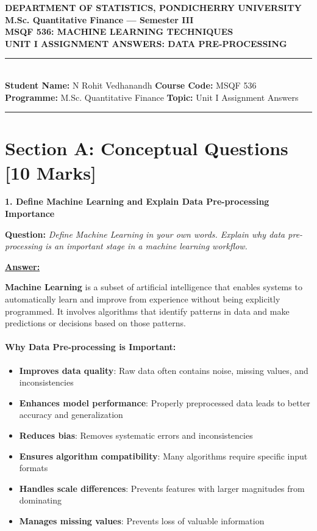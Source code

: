 \documentclass[11pt,a4paper]{article}
\newcommand{\questiontitle}[2]{%
    \vspace{0.4cm}%
    \noindent\textbf{\large\color{headerblue}#1. #2}\par\vspace{0.15cm}%
}
\newcommand{\qprompt}[1]{%
    \noindent\textbf{Question:} \textit{#1}\par\vspace{0.2cm}%
}
\newcommand{\answer}{\noindent\textbf{\underline{Answer:}}\par\vspace{0.15cm}}
\begin{document}
\begin{center}
    {\large \textbf{DEPARTMENT OF STATISTICS, PONDICHERRY UNIVERSITY}}\\[0.2em]
    {\large \textbf{M.Sc. Quantitative Finance --- Semester III}}\\[0.5em]
    {\LARGE \textbf{\color{headerblue}MSQF 536: MACHINE LEARNING TECHNIQUES}}\\[0.25em]
    {\Large \textbf{UNIT I ASSIGNMENT ANSWERS: DATA PRE-PROCESSING}}\\[0.5em]
    \rule{\linewidth}{1pt}\\[0.35em]
    \textbf{Student Name:} N Rohit Vedhanandh \hfill \textbf{Course Code:} MSQF 536\\
    \textbf{Programme:} M.Sc. Quantitative Finance \hfill \textbf{Topic:} Unit I Assignment Answers
    \rule{\linewidth}{1pt}
\end{center}
\vspace{0.2cm}

\section*{Section A: Conceptual Questions \hfill [10 Marks]}

\questiontitle{1}{Define Machine Learning and Explain Data Pre-processing Importance}
\qprompt{Define Machine Learning in your own words. Explain why data pre-processing is an important stage in a machine learning workflow.}
\answer
\textbf{Machine Learning} is a subset of artificial intelligence that enables systems to automatically learn and improve from experience without being explicitly programmed. It involves algorithms that identify patterns in data and make predictions or decisions based on those patterns.

\paragraph{Why Data Pre-processing is Important:}
\begin{itemize}
    \item \textbf{Improves data quality}: Raw data often contains noise, missing values, and inconsistencies
    \item \textbf{Enhances model performance}: Properly preprocessed data leads to better accuracy and generalization
    \item \textbf{Reduces bias}: Removes systematic errors and inconsistencies
    \item \textbf{Ensures algorithm compatibility}: Many algorithms require specific input formats
    \item \textbf{Handles scale differences}: Prevents features with larger magnitudes from dominating
    \item \textbf{Manages missing values}: Prevents loss of valuable information
\end{itemize}
\end{document}
